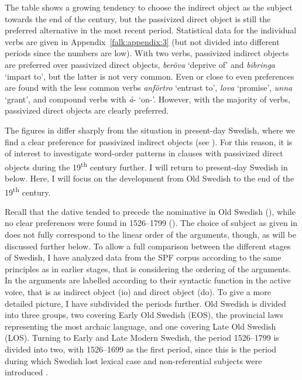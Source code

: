 \documentclass[output=paper]{langscibook}
\begin{document}
The table shows a growing tendency to choose the indirect object as the subject towards the end of the century, but the passivized direct object is still the preferred alternative in the most recent period. Statistical data for the individual verbs are given in Appendix~\ref{falk:appendix:3} (but not divided into different periods since the numbers are low). With two verbs, passivized indirect objects are preferred over passivized direct objects, \textit{beröva} ‘deprive of’ and \textit{bibringa} ‘impart to’, but the latter is not very common. Even or close to even preferences are found with the less common verbs \textit{anförtro} ‘entrust to’, \textit{lova} ‘promise’, \textit{unna} ‘grant’, and compound verbs with \textit{å}{}- ‘on-’. However, with the majority of verbs, passivized direct objects are clearly preferred.


The figures in  differ sharply from the situation in present-day Swedish, where we find a clear preference for passivized indirect objects (see ). For this reason, it is of interest to investigate word-order patterns in clauses with passivized direct objects during the 19\textsuperscript{th} century further. I will return to present-day Swedish in  below. Here, I will focus on the development from Old Swedish to the end of the 19\textsuperscript{th} century.



Recall that the dative tended to precede the nominative in Old Swedish (), while no clear preferences were found in 1526–1799 (). The choice of subject as given in  does not fully correspond to the linear order of the arguments, though, as will be discussed further below. To allow a full comparison between the different stages of Swedish, I have analyzed data from the SPF corpus according to the same principles as in earlier stages, that is considering the ordering of the arguments. In  the arguments are labelled according to their syntactic function in the active voice, that is as indirect object (io) and direct object (do). To give a more detailed picture, I have subdivided the periods further. Old Swedish is divided into three groups, two covering Early Old Swedish (EOS), the provincial laws representing the most archaic language, and one covering Late Old Swedish (LOS). Turning to Early and Late Modern Swedish, the period 1526–1799 is divided into two, with 1526–1699 as the first period, since this is the period during which Swedish lost lexical case and non-referential subjects were introduced \citep{Falk1993}.
\end{document}
